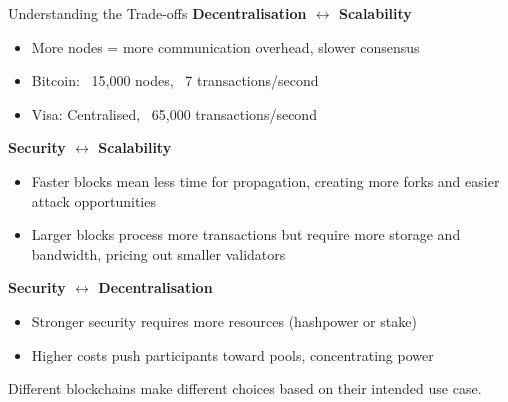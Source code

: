 \documentclass[10pt]{beamer}
\begin{document}
\begin{frame}{Understanding the Trade-offs}
  \textbf{Decentralisation $\longleftrightarrow$ Scalability}
  \begin{itemize}
    \item More nodes = more communication overhead, slower consensus
    \item Bitcoin: ~15,000 nodes, ~7 transactions/second
    \item Visa: Centralised, ~65,000 transactions/second
  \end{itemize}
  
  \vspace{0.5em}
  \textbf{Security $\longleftrightarrow$ Scalability}
  \begin{itemize}
    \item Faster blocks mean less time for propagation, creating more forks and easier attack opportunities
    \item Larger blocks process more transactions but require more storage and bandwidth, pricing out smaller validators
  \end{itemize}
  
  \vspace{0.5em}
  \textbf{Security $\longleftrightarrow$ Decentralisation}
  \begin{itemize}
    \item Stronger security requires more resources (hashpower or stake)
    \item Higher costs push participants toward pools, concentrating power
  \end{itemize}
  
  \vspace{1em}
  Different blockchains make different choices based on their intended use case.
\end{frame}
\end{document}
